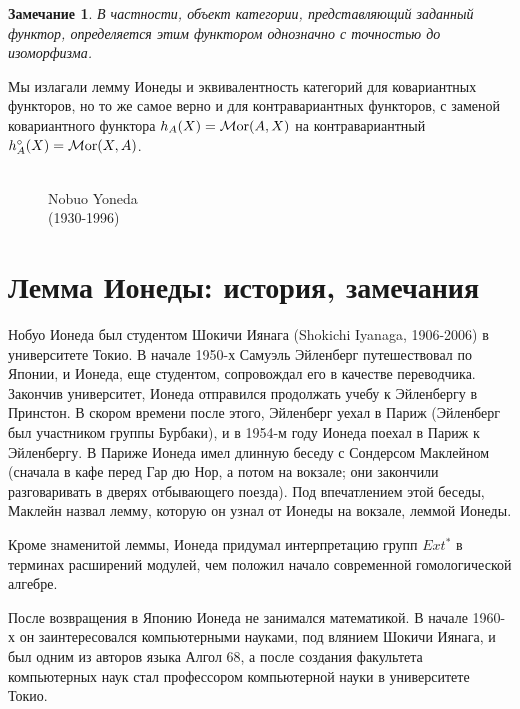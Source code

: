 \documentclass[12pt]{book}
\def\endproof{\hbox{\vrule width 5pt height 5pt depth 0pt}}
\newcommand{\Mor}{\operatorname{{\cal M}or}}
\theoremstyle{upshape}
\newtheorem{zadacha}{Задача}[chapter]
\theoremstyle{generic}
\newtheorem{remark}[teorema]{Замечание}
\def\замечание{\begin{remark}}
\def\еза{\end{remark}}
\theoremstyle{upshapenonumber}
\newcommand{\следствие}{%
     \refstepcounter{teorema}
     {\noindent\bf Следствие \thechapter.\arabic{teorema}:\ }}
\newcommand{\пример}{%
     \refstepcounter{teorema}
     {\noindent\bf Пример \thechapter.\arabic{teorema}:\ }}
\newcommand{\лемма}{%
     \refstepcounter{teorema}
     {\noindent\bf Лемма \thechapter.\arabic{teorema}:\ }}
\newcommand{\теорема}{%
     \refstepcounter{teorema}
     {\noindent\bf Теорема \thechapter.\arabic{teorema}:\ }}
\newcommand{\утверждение}{%
     \refstepcounter{teorema}
     {\noindent\bf Утверждение \thechapter.\arabic{teorema}:\ }}
\def\ем{\em}
\def\задача{\begin{zadacha}}
\def\ез{\end{zadacha}}
\def\еу{\end{ukazanie}}
\def\ео{\end{opredelenie}}
\def\енум{\begin{enumerate}}
\def\ее{\end{enumerate}}
\begin{document}
\endproof

\замечание\label{_predstavlya_edinstv_Zamechanie_}
В частности, объект категории, представляющий заданный
функтор, определяется этим функтором однозначно с
точностью до изоморфизма.
\еза

Мы излагали лемму Ионеды и эквивалентность
категорий для ковариантных функторов, но то же самое
верно и для контравариантных функторов, с заменой
ковариантного функтора $h_A(X) =\Mor(A,X)$ на 
контравариантный $h^\circ_A(X) = \Mor(X,A)$.

\begin{figure}[ht]
\begin{center}
\\
{Nobuo Yoneda\\
(1930-1996)}
\end{center}
\end{figure}


\section{Лемма Ионеды: история, замечания}


Нобуо Ионеда был студентом Шокичи Иянага (Shokichi Iyanaga,
1906-2006) в университете Токио. В начале 1950-х Самуэль Эйленберг
путешествовал по Японии, и Ионеда, еще студентом, 
сопровождал его  в качестве переводчика.
Закончив университет, Ионеда отправился продолжать
учебу к Эйленбергу в Принстон. В скором времени после этого,
Эйленберг уехал в Париж (Эйленберг был участником
группы Бурбаки), и в 1954-м году Ионеда поехал в Париж к 
Эйленбергу. В Париже Ионеда имел длинную беседу с 
Сондерсом  Маклейном (сначала в кафе перед Гар дю Нор, а
потом на вокзале; они закончили разговаривать
в дверях отбывающего поезда). Под впечатлением
этой беседы, Маклейн назвал лемму, которую 
он узнал от Ионеды на вокзале, леммой Ионеды.

Кроме знаменитой леммы, Ионеда придумал интерпретацию
групп $Ext^*$ в терминах расширений модулей, чем
положил начало современной гомологической алгебре.

После возвращения в Японию Ионеда не занимался 
математикой. В начале 1960-х он заинтересовался 
компьютерными науками, под влянием Шокичи Иянага, 
и был одним из авторов  языка Алгол 68, а после 
создания факультета компьютерных наук стал профессором
компьютерной науки в университете Токио.
\end{document}
